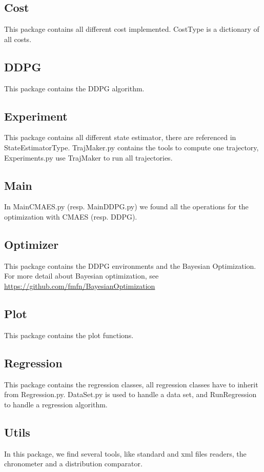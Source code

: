 \documentclass[a4paper]{article}
\begin{document}
\subsection{Cost}
This package contains all different cost implemented. CostType is a dictionary of all costs.

\subsection{DDPG}
This package contains the DDPG algorithm.

\subsection{Experiment}
This package contains all different state estimator, there are referenced in StateEstimatorType. 
TrajMaker.py contains the tools to compute one trajectory, Experiments.py use TrajMaker to run all trajectories.

\subsection{Main}
In MainCMAES.py (resp. MainDDPG.py) we found all the operations for the optimization with CMAES (resp. DDPG).

\subsection{Optimizer}
This package contains the DDPG environments and the Bayesian Optimization. For more detail about Bayesian optimization, see 
\url{https://github.com/fmfn/BayesianOptimization} 

\subsection{Plot}
This package contains the plot functions.

\subsection{Regression}
This package contains the regression classes, all regression classes have to inherit from Regression.py.
DataSet.py is used to handle a data set, and RunRegression to handle a regression algorithm.

\subsection{Utils}
In this package, we find several tools, like standard and xml files readers, the chronometer and a distribution comparator.
\end{document}

